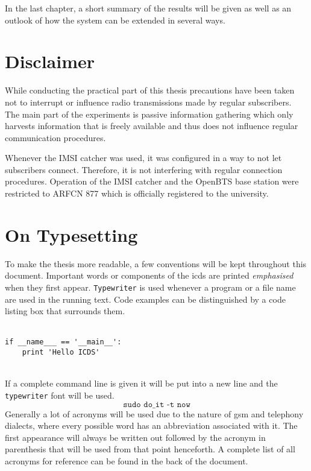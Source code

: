 In the last chapter, a short summary of the results will be given as well as an outlook of how the system can be extended in several ways.

\section{Disclaimer}
While conducting the practical part of this thesis precautions have been taken not to interrupt or influence radio transmissions made by regular subscribers.
The main part of the experiments is passive information gathering which only harvests information that is freely available and thus does not influence regular communication procedures.

Whenever the IMSI catcher was used, it was configured in a way to not let subscribers connect.
Therefore, it is not interfering with regular connection procedures.
Operation of the IMSI catcher and the OpenBTS base station were restricted to ARFCN 877 which is officially registered to the university.

\section{On Typesetting}
To make the thesis more readable, a few conventions will be kept throughout this document.
Important words or components of the \gls{icds} are printed \emph{emphasised} when they first appear.
\texttt{Type\-writer} is used whenever a program or a file name are used in the running text.
Code examples can be distinguished by a code listing box that surrounds them.\\\\
\hspace*{\dimexpr\fboxsep+\fboxrule}%
\begin{minipage}{\dimexpr\textwidth-4\fboxsep-2\fboxrule} 
\begin{lstlisting} 
if __name___ == '__main__':
    print 'Hello ICDS'
\end{lstlisting} 
\end{minipage}\\
If a complete command line is given it will be put into a new line and the \texttt{typewriter} font will be used.
\[\texttt{sudo do\_it -t now}\]
Generally a lot of acronyms will be used due to the nature of \gls{gsm} and telephony dialects, where every possible word has an abbreviation associated with it.
The first appearance will always be written out followed by the acronym in parenthesis that will be used from that point henceforth.
A complete list of all acronyms for reference can be found in the back of the document.